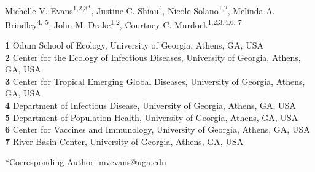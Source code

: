 \documentclass[12pt]{article}
\begin{document}
{\Large
\textbf{}}
\\
Michelle V. Evans\textsuperscript{1,2,3*},
Justine C. Shiau\textsuperscript{4},
Nicole Solano\textsuperscript{1,2},
Melinda A. Brindley\textsuperscript{4, 5},
John M. Drake\textsuperscript{1,2},
Courtney C. Murdock\textsuperscript{1,2,3,4,6, 7}
\\

\hrulefill

\noindent
\textbf{1} Odum School of Ecology, University of Georgia, Athens, GA, USA
\\
\textbf{2} Center for the Ecology of Infectious Diseases, University of Georgia, Athens, GA, USA
\\
\textbf{3} Center for Tropical Emerging Global Diseases, University of Georgia, Athens, GA, USA
\\
\textbf{4} Department of Infectious Disease, University of Georgia, Athens, GA, USA
\\
\textbf{5} Department of Population Health, University of Georgia, Athens, GA, USA
\\
\textbf{6} Center for Vaccines and Immunology, University of Georgia, Athens, GA, USA
\\
\textbf{7} River Basin Center, University of Georgia, Athens, GA, USA
\\
\smallskip

\noindent
*Corresponding Author: mvevans@uga.edu
\bigskip

\hrulefill
\end{document}
